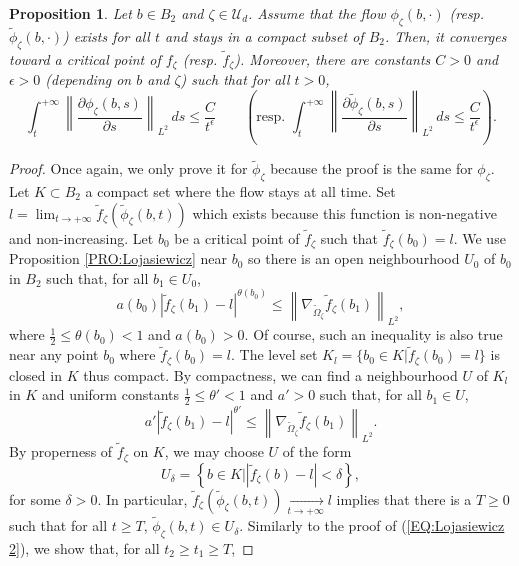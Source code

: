 \documentclass{article}
\newtheorem{proposition}[theorem]{Proposition}
\theoremstyle{remark}
\theoremstyle{definition}
\newcommand{\tend}[2]{\underset{#1 \rightarrow #2}{\longrightarrow}}
\newcommand{\abs}[1]{\left| #1 \right|}
\newcommand{\norme}[1]{\left\| #1 \right\|}
\newcommand{\mU}{\mathcal{U}}
\renewcommand{\leq}{\leqslant}
\renewcommand{\geq}{\geqslant}
\begin{document}
\begin{proposition}\label{PRO:Convergence flux}
    Let $b \in B_2$ and $\zeta \in \mU_d$. Assume that the flow $\phi_\zeta(b,\cdot)$ (resp. $\tilde{\phi}_\zeta(b,\cdot)$) exists for all $t$ and stays in a compact subset of $B_2$. Then, it converges toward a critical point of $f_\zeta$ (resp. $\tilde{f}_\zeta$). Moreover, there are constants $C > 0$ and $\epsilon > 0$ (depending on $b$ and $\zeta$) such that for all $t > 0$,
    $$
    \int_t^{+\infty} \norme{\frac{\partial\phi_\zeta(b,s)}{\partial s}}_{L^2} \, ds \leq \frac{C}{t^\epsilon} \qquad \left(\textrm{resp. } \int_t^{+\infty} \norme{\frac{\partial\tilde{\phi}_\zeta(b,s)}{\partial s}}_{L^2} \, ds \leq \frac{C}{t^\epsilon}\right).
    $$
\end{proposition}
\begin{proof}
Once again, we only prove it for $\tilde{\phi}_\zeta$ because the proof is the same for $\phi_\zeta$. Let $K \subset B_2$ a compact set where the flow stays at all time. Set $l = \lim_{t \rightarrow +\infty} \tilde{f}_\zeta(\tilde{\phi}_\zeta(b,t))$ which exists because this function is non-negative and non-increasing. Let $b_0$ be a critical point of $\tilde{f}_\zeta$ such that $\tilde{f}_\zeta(b_0) = l$. We use Proposition \ref{PRO:Lojasiewicz} near $b_0$ so there is an open neighbourhood $U_0$ of $b_0$ in $B_2$ such that, for all $b_1 \in U_0$,
$$
a(b_0)\abs{\tilde{f}_\zeta(b_1) - l}^{\theta(b_0)} \leq \norme{\nabla_{\tilde{\Omega}_\zeta}\tilde{f}_\zeta(b_1)}_{L^2},
$$
where $\frac{1}{2} \leq \theta(b_0) < 1$ and $a(b_0) > 0$. Of course, such an inequality is also true near any point $b_0$ where $\tilde{f}_\zeta(b_0) = l$. The level set $K_l = \{b_0 \in K|\tilde{f}_\zeta(b_0) = l\}$ is closed in $K$ thus compact. By compactness, we can find a neighbourhood $U$ of $K_l$ in $K$ and uniform constants $\frac{1}{2} \leq \theta' < 1$ and $a' > 0$ such that, for all $b_1 \in U$,
\begin{equation}\label{EQ:Lojasiewicz 3}
    a'\abs{\tilde{f}_\zeta(b_1) - l}^{\theta'} \leq \norme{\nabla_{\tilde{\Omega}_\zeta}\tilde{f}_\zeta(b_1)}_{L^2}.
\end{equation}
By properness of $\tilde{f}_\zeta$ on $K$, we may choose $U$ of the form
$$
U_\delta = \left\{b \in K|\abs{\tilde{f}_\zeta(b) - l} < \delta\right\},
$$
for some $\delta > 0$. In particular, $\tilde{f}_\zeta(\tilde{\phi}_\zeta(b,t)) \tend{t}{+\infty} l$ implies that there is a $T \geq 0$ such that for all $t \geq T$, $\tilde{\phi}_\zeta(b,t) \in U_\delta$. Similarly to the proof of (\ref{EQ:Lojasiewicz 2}), we show that, for all $t_2 \geq t_1 \geq T$,

\end{proof}
\end{document}
